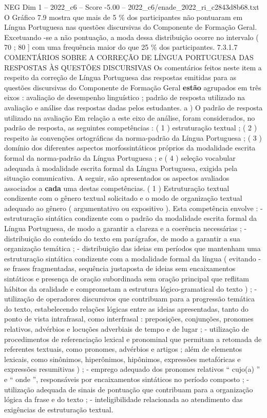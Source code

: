 \begin{textsample}{NEG Dim 1 – 2022\_c6 – Score -5.00 – 2022\_c6/enade\_2022\_ri\_c2843d8b68.txt}
O Gráfico 7.9 mostra que mais de 5 \% dos participantes não pontuaram em Língua Portuguesa nas questões discursivas do Componente de Formação Geral.
Excetuando -se a não pontuação, a moda dessa distribuição ocorre no intervalo ( 70 ; 80 ] com uma frequência maior do que 25 \% dos participantes. 7.3.1.7 COMENTÁRIOS SOBRE A CORREÇÃO DE LÍNGUA PORTUGUESA DAS RESPOSTAS ÀS QUESTÕES DISCURSIVAS Os comentários feitos neste item a respeito da correção de Língua Portuguesa das respostas emitidas para as questões discursivas do Componente de Formação Geral \textbf{estão} agrupados em três eixos : avaliação de desempenho linguístico ; padrão de resposta utilizado na avaliação e análise das respostas dadas pelos estudantes. a ) O padrão de resposta utilizado na avaliação Em relação a este eixo de análise, foram considerados, no padrão de resposta, as seguintes competências : ( 1 ) estruturação textual ; ( 2 ) respeito às convenções ortográficas da norma-padrão da Língua Portuguesa ; ( 3 ) domínio dos diferentes aspectos morfossintáticos próprios da modalidade escrita formal da norma-padrão da Língua Portuguesa ; e ( 4 ) seleção vocabular adequada à modalidade escrita formal da Língua Portuguesa, exigida pela situação comunicativa.
A seguir, são apresentados os aspectos avaliados associados a \textbf{cada} uma destas competências. ( 1 ) Estruturação textual condizente com o gênero textual solicitado e o modo de organização textual adequado ao gênero ( argumentativo ou expositivo ).
Esta competência envolve : - estruturação sintática condizente com o padrão da modalidade escrita formal da Língua Portuguesa, de modo a garantir a clareza e a coerência necessárias ; - distribuição do conteúdo do texto em parágrafos, de modo a garantir a sua organização temática ; - distribuição das ideias em períodos que mantenham uma estruturação sintática condizente com a modalidade formal da língua ( evitando -se frases fragmentadas, sequência justaposta de ideias sem encaixamentos sintáticos e presença de oração subordinada sem oração principal que reflitam hábitos da oralidade e comprometam a estrutura lógico-gramatical do texto ) ; - utilização de operadores discursivos que contribuam para a progressão temática do texto, estabelecendo relações lógicas entre as ideias apresentadas, tanto do ponto de vista intrafrasal, como interfrasal : preposições, conjunções, pronomes relativos, advérbios e locuções adverbiais de tempo e de lugar ; - utilização de procedimentos de referenciação lexical e pronominal que permitam a retomada de referentes textuais, como pronomes, advérbios e artigos ; além de elementos lexicais, como sinônimos, hiperônimos, hipônimos, expressões metafóricas e expressões resumitivas ) ; - emprego adequado dos pronomes relativos “ cujo(a) ” e “ onde ”, responsáveis por encaixamentos sintáticos no período composto ; - utilização adequada de sinais de pontuação que contribuam para a organização lógica da frase e do texto ; - inteligibilidade relacionada ao atendimento das exigências de estruturação textual.

\end{textsample}
